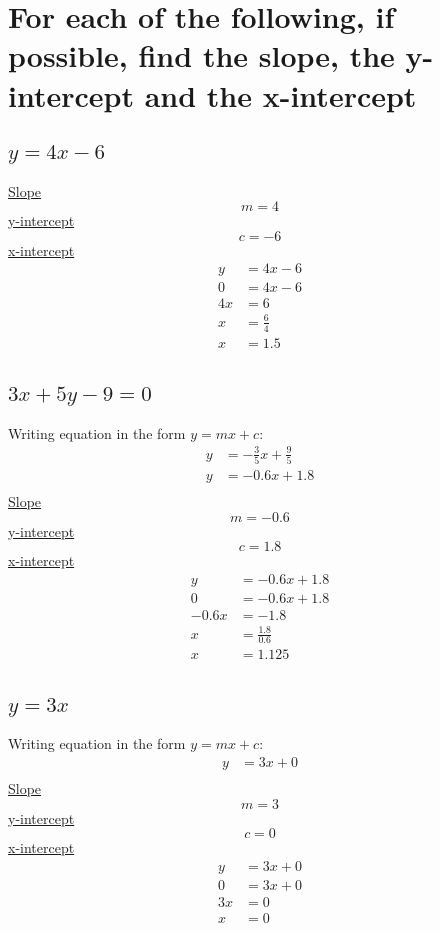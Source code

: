 \documentclass{article}
\begin{document}
\section{For each of the following, if possible, find the slope, the y-intercept and the x-intercept}
\subsection{$y=4x-6$}
\underline{Slope}
$$
    m=4
$$
\underline{y-intercept}
$$
    c = -6
$$
\underline{x-intercept}
$$
    \begin{aligned}
        y  & =4x - 6      \\
        0  & =4x - 6      \\
        4x & =6           \\
        x  & =\frac{6}{4} \\
        x  & =1.5         \\
    \end{aligned}
$$
\subsection{$3x+5y-9=0$}
Writing equation in the form $y=mx+c$:
$$
    \begin{aligned}
        y & = -\frac{3}{5}x+\frac{9}{5} \\
        y & =-0.6x+1.8                  \\
    \end{aligned}
$$
\underline{Slope}
$$
    m=-0.6
$$
\underline{y-intercept}
$$
    c = 1.8
$$
\underline{x-intercept}
$$
    \begin{aligned}
        y     & =-0.6x+1.8       \\
        0     & =-0.6x+1.8       \\
        -0.6x & =-1.8            \\
        x     & =\frac{1.8}{0.6} \\
        x     & = 1.125          \\
    \end{aligned}
$$
\subsection{$y=3x$}
Writing equation in the form $y=mx+c$:
$$
    \begin{aligned}
        y & = 3x + 0 \\
    \end{aligned}
$$
\underline{Slope}
$$
    m=3
$$
\underline{y-intercept}
$$
    c = 0
$$
\underline{x-intercept}
$$
    \begin{aligned}
        y  & = 3x + 0 \\
        0  & = 3x + 0 \\
        3x & = 0      \\
        x  & = 0      \\
    \end{aligned}
$$
\end{document}
